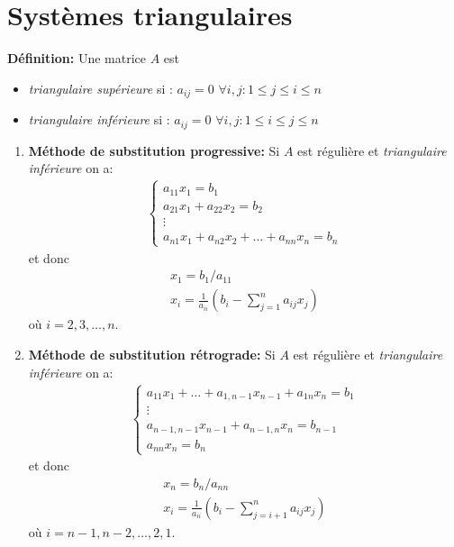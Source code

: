 \section{Systèmes triangulaires}
\textbf{Définition:} Une matrice $A$ est 
\begin{itemize}
	\item \emph{triangulaire supérieure} si : $a_{ij}=0$ $\forall i,j : 1\leq j\leq i \leq n$
	\item \emph{triangulaire inférieure} si : $a_{ij}=0$ $\forall i,j : 1\leq i\leq j \leq n$
\end{itemize}

\begin{enumerate}
	\item \textbf{Méthode de substitution progressive:}
	Si $A$ est régulière et \emph{triangulaire inférieure} on a:
	\begin{eqnarray}
		\begin{cases}
			a_{11}x_1=b_1
			\\
			a_{21}x_1+a_{22}x_2=b_2
			\\
			\vdots
			\\
			a_{n1}x_1+a_{n2}x_2+\dots+a_{nn}x_n=b_n
		\end{cases}
	\end{eqnarray}
	et donc
	\begin{eqnarray}
		x_1=b_1/a_{11}
		\\
		x_i=\frac{1}{a_{ii}}\left(b_i-\sum_{j=1}^na_{ij}x_j\right)
	\end{eqnarray}
	où $i = 2,3,\dots,n$.
	\item \textbf{Méthode de substitution rétrograde:}
	Si $A$ est régulière et \emph{triangulaire inférieure} on a:
	\begin{eqnarray}
		\begin{cases}
			a_{11}x_1+\dots+a_{1,n-1}x_{n-1}+a_{1n}x_n=b_1
			\\
			\vdots
			\\
			a_{n-1,n-1}x_{n-1}+a_{n-1,n}x_n=b_{n-1}
			\\
			a_{nn}x_n=b_n
		\end{cases}
	\end{eqnarray}
	et donc
	\begin{eqnarray}
		x_n=b_n/a_{nn}
		\\
		x_i=\frac{1}{a_{ii}}\left(b_i-\sum_{j=i+1}^na_{ij}x_j\right)
	\end{eqnarray}
	où $i = n-1,n-2,\dots,2,1$.
\end{enumerate}

